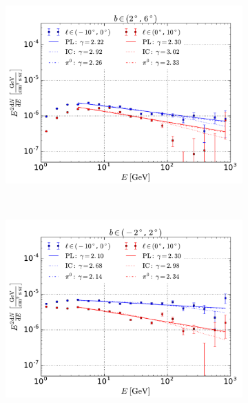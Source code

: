 \begin{figure}[h!]
    \begin{subfigure}{0.49\textwidth}
        \includegraphics[width=\textwidth]{plots/SED_boxes_source_4.pdf}
    \end{subfigure}\\
    \begin{subfigure}{0.49\textwidth}
        \includegraphics[width=\textwidth]{plots/SED_boxes_source_0.pdf}
    \end{subfigure} \\
    \begin{subfigure}{0.49\textwidth}

\end{subfigure}
\end{figure}
